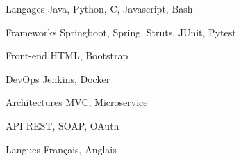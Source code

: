 

\begin{cvskills}

  \cvskill
    {Langages} %
    {Java, Python, C, Javascript, Bash} %

  \cvskill
    {Frameworks} %
    {Springboot, Spring, Struts, JUnit, Pytest} %

  \cvskill
    {Front-end} %
    {HTML, Bootstrap} %

  \cvskill
    {DevOps} %
    {Jenkins, Docker} %

  \cvskill
    {Architectures} %
    {MVC, Microservice} %

  \cvskill
    {API} %
    {REST, SOAP, OAuth} %

  \cvskill
    {Langues} %
    {Français, Anglais} %

\end{cvskills}
